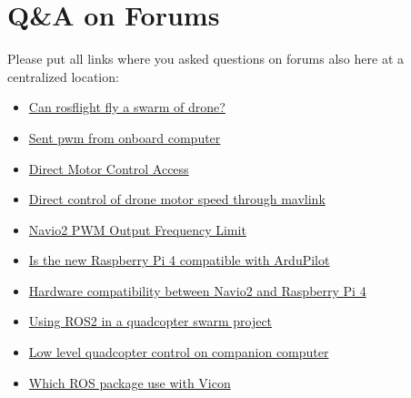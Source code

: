 \chapter{Q\&A on Forums}
Please put all links where you asked questions on forums also here at a centralized location:
\begin{itemize}
    \item \href{https://github.com/rosflight/rosflight/issues/100}{Can rosflight fly a swarm of drone?}
    \item \href{https://github.com/rosflight/rosflight/issues/98}{Sent pwm from onboard computer}
    \item \href{https://github.com/PX4/Firmware/pull/10863}{Direct Motor Control Access}
    \item \href{https://github.com/ArduPilot/ardupilot/issues/11859}{Direct control of drone motor speed through mavlink}
    \item \href{https://community.emlid.com/t/navio2-pwm-output-frequency-limit/1934}{Navio2 PWM Output Frequency Limit}
    \item \href{https://discuss.ardupilot.org/t/is-the-new-raspberry-pi-4-compatible-with-ardupilot/44956}{Is the new Raspberry Pi 4 compatible with ArduPilot}
    \item \href{https://community.emlid.com/t/hardware-compatibility-between-navio2-and-raspberry-pi-4/15344}{Hardware compatibility between Navio2 and Raspberry Pi 4}
    \item \href{https://discuss.px4.io/t/using-ros2-in-a-quadcopter-swarm-project/12055}{Using ROS2 in a quadcopter swarm project}
    \item \href{https://discuss.px4.io/t/low-level-quadcopter-control-on-companion-computer/12081}{Low level quadcopter control on companion computer}
    \item \href{https://answers.ros.org/question/329849/which-ros-package-use-with-vicon/}{Which ROS package use with Vicon}
\end{itemize}
